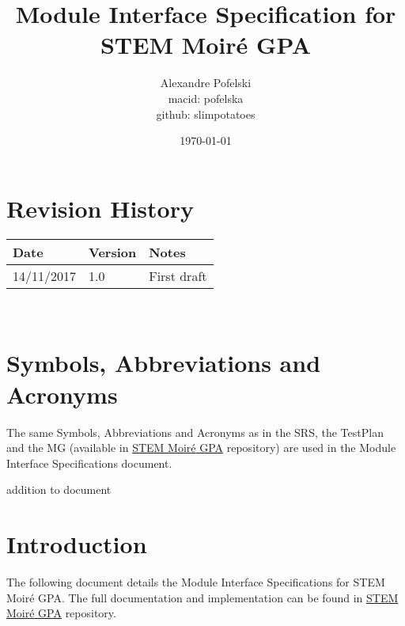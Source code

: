 \documentclass[12pt, titlepage]{article}
\newcommand{\progname}{STEM Moir{\'e} GPA}
\begin{document}
\title{Module Interface Specification for \progname{}}

\author{Alexandre Pofelski \\
		macid: pofelska \\
		github: slimpotatoes}

\date{\today}

\maketitle


\section{Revision History}

\begin{tabularx}{\textwidth}{p{3cm}p{2cm}X}
\toprule {\bf Date} & {\bf Version} & {\bf Notes}\\
\midrule
14/11/2017 & 1.0 & First draft \\
\bottomrule
\end{tabularx}

~\newpage

\section{Symbols, Abbreviations and Acronyms}

The same Symbols, Abbreviations and Acronyms as in the SRS, the TestPlan and the MG (available in \href{https://github.com/slimpotatoes/STEM_Moire_GPA}{\progname{}} repository) are used in the Module Interface Specifications document. 

addition to document


\newpage

\tableofcontents

\newpage


\section{Introduction}

The following document details the Module Interface Specifications for \progname{}. The full documentation and implementation can be found in \href{https://github.com/slimpotatoes/STEM_Moire_GPA}{\progname{}} repository.
\end{document}
